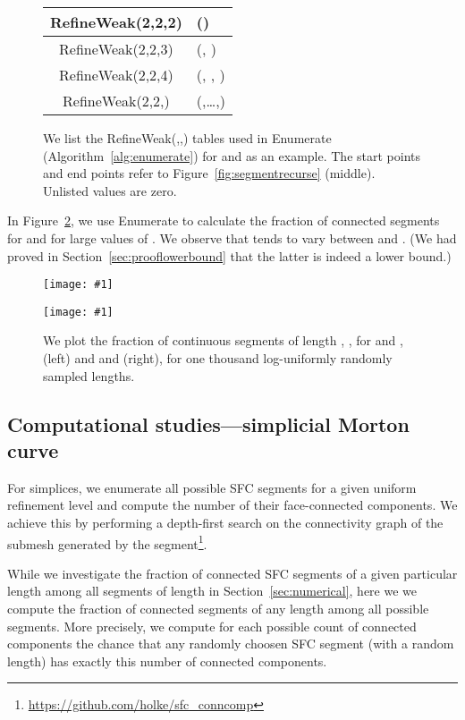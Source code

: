 \documentclass[a4paper,11pt]{article}
\newcommand{\inputtikz}[1]{\texttt{[image: \#1]}}
\newcommand{\figlab}[1]{\label{fig:#1}}
\newcommand{\figref}[1]{Figure~\ref{fig:#1}}
\newcommand{\secref}[1]{Section~\ref{sec:#1}}
\newcommand{\algref}[1]{Algorithm~\ref{alg:#1}}
\begin{document}
\begin{figure}\centering
  \renewcommand{\arraystretch}{1.1}
  \begin{tabular}{|c|l|}\hline
    RefineWeak(2,2,2) &  ()
    \\ \hline
    RefineWeak(2,2,3) &  (,
    )
    \\ \hline
    RefineWeak(2,2,4) &  (,
    , )
    \\ \hline
    RefineWeak(2,2,) &
     (,\dots,)
    \\ \hline
  \end{tabular}
  \caption{We list the RefineWeak(,,) tables used in Enumerate
    (\algref{enumerate}) for  and  as an example.  The start points
    and end points refer to \figref{segmentrecurse} (middle).  Unlisted values
    are zero.}\figlab{refineweak}
\end{figure}

In \figref{enumerate}, we use Enumerate to calculate the fraction of connected
segments  for  and  for large values of .  We
observe that  tends to vary between  and
.
(We had proved in \secref{prooflowerbound} that the latter is indeed a lower
bound.)

\begin{figure}\centering
  \begin{minipage}{0.49\textwidth}\centering
    \inputtikz{enumerate2d}
  \end{minipage}
  \begin{minipage}{0.49\textwidth}\centering
    \inputtikz{enumerate3d}
  \end{minipage}
  \caption{We plot the fraction of continuous segments of length ,
    , for  and , (left) and  and 
    (right), for one thousand log-uniformly randomly sampled lengths.
}\figlab{enumerate}
\end{figure}

\subsection{Computational studies---simplicial Morton curve}

For simplices, we enumerate all possible SFC segments for a given uniform
refinement level and compute the number of their face-connected components.
We achieve this by performing a depth-first search on the connectivity
graph of the submesh generated by the segment\footnote{\url{https://github.com/holke/sfc_conncomp}}.

While we investigate the fraction of connected SFC segments of a given
particular length  among all segments of length  in \secref{numerical},
here we we compute the fraction of connected segments of any length among all
possible segments.
More precisely, we compute for each possible count of connected components
the chance that any randomly choosen SFC segment (with a random length) has
exactly this number of connected components.
\end{document}
